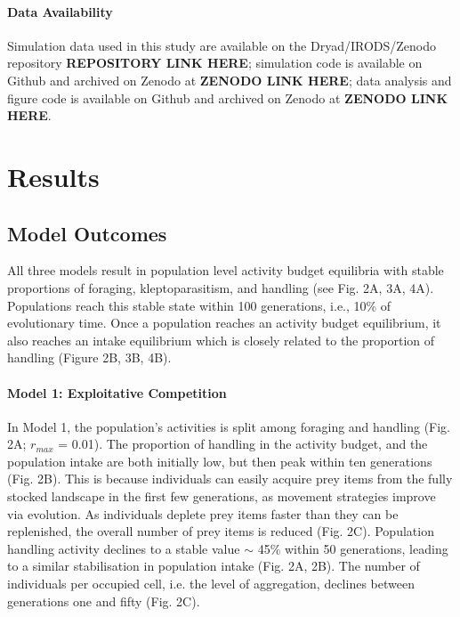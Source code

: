 \documentclass[11pt]{article}
\begin{document}
\paragraph*{Data Availability}

Simulation data used in this study are available on the Dryad/IRODS/Zenodo repository \textbf{REPOSITORY LINK HERE}; 
simulation code is available on Github and archived on Zenodo at \textbf{ZENODO LINK HERE}; 
data analysis and figure code is available on Github and archived on Zenodo at \textbf{ZENODO LINK HERE}.

\section{Results}

\subsection{Model Outcomes}

All three models result in population level activity budget equilibria with stable proportions of foraging, kleptoparasitism, and handling (see Fig. 2A, 3A, 4A).
Populations reach this stable state within 100 generations, i.e., 10\% of evolutionary time.
Once a population reaches an activity budget equilibrium, it also reaches an intake equilibrium which is closely related to the proportion of handling (Figure 2B, 3B, 4B).

\paragraph{Model 1: Exploitative Competition}

In Model 1, the population's activities is split among foraging and handling (Fig. 2A; $r_{max}$ = 0.01).
The proportion of handling in the activity budget, and the population intake are both initially low, but then peak within ten generations (Fig. 2B).
This is because individuals can easily acquire prey items from the fully stocked landscape in the first few generations, as movement strategies improve via evolution.
As individuals deplete prey items faster than they can be replenished, the overall number of prey items is reduced (Fig. 2C).
Population handling activity declines to a stable value $\sim$ 45\% within 50 generations, leading to a similar stabilisation in population intake (Fig. 2A, 2B).
The number of individuals per occupied cell, i.e. the level of aggregation, declines between generations one and fifty (Fig. 2C).
\end{document}
